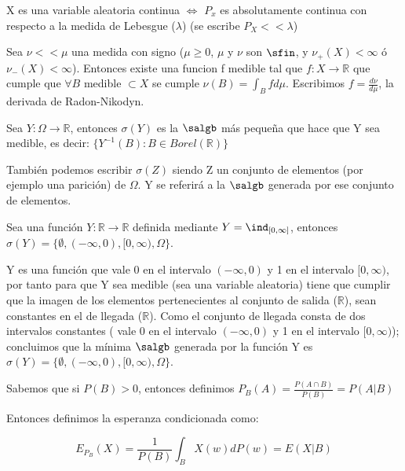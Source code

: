 \documentclass{apuntes}
\begin{document}
\begin{defn}
X es una variable aleatoria continua $\Leftrightarrow$ $P_x$ es absolutamente continua con respecto a la medida de Lebesgue ($\lambda$) (se escribe $P_X << \lambda$)
\end{defn}

\begin{theorem}
Sea $\nu << \mu$ una medida con signo ($\mu \geq 0$, $\mu$ y $\nu$ son $\sfin$, y $\nu_+(X) < \infty$ ó $\nu_-(X) < \infty$). Entonces existe una funcion f medible tal que $f:X \rightarrow \mathbb{R}$ que cumple que $\forall B$ medible $\subset X$ se cumple $\nu(B)=\int_Bfd\mu$. Escribimos $f=\frac{d\nu}{d\mu}$, la derivada de Radon-Nikodyn.
\end{theorem}


\begin{defn}
Sea $Y: \Omega \rightarrow \mathbb{R}$, entonces $\sigma(Y)$ es la $\salgb$ más pequeña que hace que Y sea medible, es decir: $\{Y^{-1}(B):B \in Borel(\mathbb{R})\}$
\end{defn}

\obs También podemos escribir $\sigma(Z)$ siendo Z un conjunto de elementos (por ejemplo una parición) de $\Omega$. Y se referirá a la $\salgb$ generada por ese conjunto de elementos.

\begin{example}
Sea una función $Y:\mathbb{R} \rightarrow \mathbb{R}$ definida mediante $Y=\ind_{[0,\infty]}$, entonces $\sigma(Y)=\{\emptyset, (-\infty, 0), [0, \infty), \Omega \}$.

\begin{expla}
Y es una función que vale 0 en el intervalo $(-\infty, 0)$ y 1 en el intervalo $[0, \infty)$, por tanto para que Y sea medible (sea una variable aleatoria) tiene que cumplir que la imagen de los elementos pertenecientes al conjunto de salida ($\mathbb{R}$), sean constantes en el de llegada ($\mathbb{R}$). Como el conjunto de llegada consta de dos intervalos constantes ( vale 0 en el intervalo $(-\infty, 0)$ y 1 en el intervalo $[0, \infty)$); concluimos que la mínima $\salgb$ generada por la función Y es $\sigma(Y)=\{\emptyset, (-\infty, 0), [0, \infty), \Omega \}$.
\end{expla}

\end{example}

\begin{defn}

Sabemos que si $P(B)>0$, entonces definimos $P_B(A)=\frac{P(A \cap B)}{P(B)}=P(A|B)$

Entonces definimos la esperanza condicionada como:

\[
E_{P_B}(X)=\frac{1}{P(B)}\int_{B}X(w)dP(w)=E(X|B)
\]
\end{defn}
\end{document}
